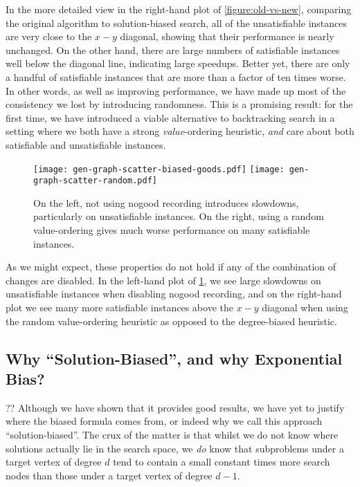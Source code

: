 \documentclass[runningheads]{llncs}
\begin{document}
In the more detailed view in the right-hand plot of \cref{figure:old-vs-new}, comparing the original
algorithm to solution-biased search, all of the unsatisfiable instances are very close to the $x-y$
diagonal, showing that their performance is nearly unchanged. On the other hand, there are large
numbers of satisfiable instances well below the diagonal line, indicating large speedups.  Better
yet, there are only a handful of satisfiable instances that are more than a factor of ten times
worse.  In other words, as well as improving performance, we have made up most of the consistency we
lost by introducing randomness.  This is a promising result: for the first time, we have introduced
a viable alternative to backtracking search in a setting where we both have a strong
\emph{value}-ordering heuristic, \emph{and} care about both satisfiable and unsatisfiable instances.

\begin{figure}[tb]
    \texttt{[image: gen-graph-scatter-biased-goods.pdf]}
    \hfill
    \texttt{[image: gen-graph-scatter-random.pdf]}
    \caption{On the left, not using nogood recording introduces slowdowns, particularly on
    unsatisfiable instances. On the right, using a random value-ordering gives much worse
    performance on many satisfiable instances.}
    \label{figure:features}
\end{figure}

As we might expect, these properties do not hold if any of the combination of changes are disabled.
In the left-hand plot of \cref{figure:features}, we see large slowdowns on unsatisfiable instances
when disabling nogood recording, and on the right-hand plot we see many more satisfiable instances
above the $x-y$ diagonal when using the random value-ordering heuristic as opposed to the
degree-biased heuristic.

\subsection{Why ``Solution-Biased'', and why Exponential Bias?}

?? Although we have shown that it provides good results, we have yet to justify where the biased
formula comes from, or indeed why we call this approach ``solution-biased''. The crux of the
matter is that whilst we do not know where solutions actually lie in the search space, we \emph{do}
know that subproblems under a target vertex of degree $d$ tend to contain a small constant times
more search nodes than those under a target vertex of degree $d - 1$.
\end{document}
